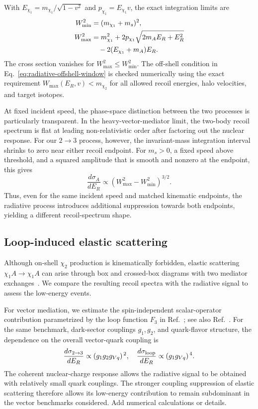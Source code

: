 \documentclass[prd,showpacs,preprintnumbers,amsmath,amssymb,twocolumn,
superscriptaddress,notitlepage]{revtex4-2}
\newcommand{\zb}[1]{{\color{blue} {#1}}}
\begin{document}
With $E_{\chi_1}=m_{\chi_1}/\sqrt{1-v^2}$ and
$p_{\chi_1}=E_{\chi_1}v$, the exact integration limits are
\begin{align}
W_{\min}^2&=(m_{\chi_1}+m_s)^2,
\label{eq:radiative-Wmin}\\
W_{\max}^2&=m_{\chi_1}^2
+2p_{\chi_1}\sqrt{2m_AE_R+E_R^2}
\notag\\
&\quad-2(E_{\chi_1}+m_A)E_R.
\label{eq:radiative-Wmax}
\end{align}
The cross section vanishes for
$W_{\max}^2\leq W_{\min}^2$.
The off-shell condition in
Eq.~\eqref{eq:radiative-offshell-window}
is checked numerically using the exact requirement
$W_{\max}(E_R,v)<m_{\chi_2}$ for all allowed recoil
energies, halo velocities, and target isotopes.

At fixed incident speed, the phase-space distinction between
the two processes is particularly transparent. In the
heavy-vector-mediator limit, the two-body recoil spectrum
is flat at leading non-relativistic order after factoring
out the nuclear response. For our $2\to3$ process, however, the invariant-mass integration interval shrinks to zero near either recoil endpoint. 
For $m_s>0$, a fixed speed above threshold, and a squared amplitude that is smooth and nonzero at the endpoint, this gives
\begin{equation}
\frac{d\sigma_A}{dE_R}
\propto
\left(W_{\max}^2-W_{\min}^2\right)^{3/2}.
\end{equation}
Thus, even for the same incident speed and matched
kinematic endpoints, the radiative process introduces
additional suppression towards both endpoints, yielding
a different recoil-spectrum shape.

\subsection{Loop-induced elastic scattering}
Although on-shell $\chi_2$ production is kinematically
forbidden, elastic scattering $\chi_1A\to\chi_1A$ can
arise through box and crossed-box diagrams with two
mediator exchanges~\cite{Bell:2018zra}. We compare the resulting recoil
spectra with the radiative signal to assess the low-energy events.

For vector mediation, we estimate the spin-independent
scalar-operator contribution parametrized by the loop
function $F_3$ in Ref.~\cite{Bell:2018zra}; see also
Ref.~\cite{Duerr:2019dmv}.
For the same benchmark, dark-sector couplings $g_1,g_2$, and
quark-flavor structure, the dependence on the overall
vector-quark coupling is
\begin{equation}
\frac{d\sigma_{2\to3}}{dE_R}\propto (g_1 g_2 g_{Vq})^{\,2},
\quad
\frac{d\sigma_{\rm loop}}{dE_R}\propto (g_1 g_{Vq})^{\,4}.
\end{equation}
The coherent nuclear-charge response allows the
radiative signal to be obtained with relatively small
quark couplings. The stronger coupling suppression of
elastic scattering therefore allows its low-energy
contribution to remain subdominant in the vector
benchmarks considered. \zb{Add numerical calculations or details.}
\end{document}
